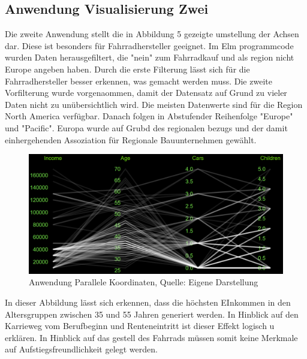 \documentclass[usegeometry=true]{scrartcl}
\begin{document}
\subsection{Anwendung Visualisierung Zwei}
Die zweite Anwendung stellt die in Abbildung 5 gezeigte umstellung der Achsen dar. Diese ist besonders für Fahrradhersteller geeignet. Im Elm programmcode wurden Daten herausgefiltert, die "nein" zum Fahrradkauf und als region nicht Europe angeben haben. Durch die erste Filterung lässt sich für die Fahrradhersteller besser erkennen, was gemacht werden muss. Die zweite Vorfilterung wurde vorgenaommen, damit der Datensatz auf Grund zu vieler Daten nicht zu unübersichtlich wird. Die meisten Datenwerte sind für die Region North America verfügbar. Danach folgen in Abstufender Reihenfolge "Europe" und "Pacific". Europa wurde auf Grubd des regionalen bezugs und der damit einhergehenden Assoziation für Regionale Bauunternehmen gewählt.
\begin{figure}[h]
\begin{center}
\includegraphics[width=16cm]{Bilder/ParallelCoordsA2.png}
\caption{Anwendung Parallele Koordinaten, Quelle: Eigene Darstellung}
\end{center}
\end{figure}
\newline In dieser Abbildung lässt sich erkennen, dass die höchsten EInkommen in den Altersgruppen zwischen 35 und 55 Jahren generiert werden. In Hinblick auf den Karrieweg vom Berufbeginn und Renteneintritt ist dieser Effekt logisch u erklären. In Hinblick auf das gestell des Fahrrads müssen somit keine Merkmale auf Aufstiegsfreundlichkeit gelegt werden. 
\newpage
\end{document}
